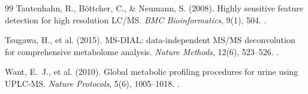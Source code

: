 \documentclass[11pt,twoside,openright]{book}
\begin{document}
\begin{thebibliography}{99}
Tautenhahn, R., B\"ottcher, C., \& Neumann, S. (2008). Highly sensitive feature detection for high resolution LC/MS. \textit{BMC Bioinformatics}, 9(1), 504. .

Tsugawa, H., et al. (2015). MS-DIAL: data-independent MS/MS deconvolution for comprehensive metabolome analysis. \textit{Nature Methods}, 12(6), 523--526. .

Want, E.~J., et al. (2010). Global metabolic profiling procedures for urine using UPLC-MS. \textit{Nature Protocols}, 5(6), 1005--1018. .

\end{thebibliography}
\end{document}
